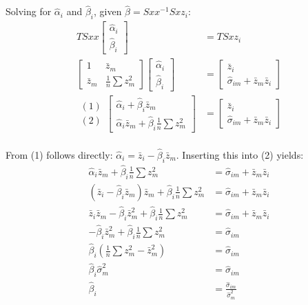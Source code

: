 \documentclass[]{article}
\begin{document}
Solving for $\hat{\alpha}_i$ and $\hat{\beta}_i$, given $\hat{\beta}=Sxx^{-1}Sxz_i$:
\begin{align*}
	TSxx \left[\begin{array}{c}
		\hat{\alpha}_i \\
		\hat{\beta}_i
	\end{array}\right] & = TSxz_i\\
	\left[\begin{array}{cc}
		1 & \bar{z}_m \\
		\bar{z}_m & \frac{1}{n}\sum{z_m^2}
	\end{array}\right] \left[\begin{array}{c}
		\hat{\alpha}_i \\
		\hat{\beta}_i
	\end{array}\right] &= \left[\begin{array}{c}
		\bar{z}_i \\
		\hat{\sigma}_{im} + \bar{z}_m \bar{z}_i 
	\end{array}\right] \\	
	\begin{array}{c}
		(1) \\
		(2)
	\end{array}
	\left[\begin{array}{c}
		\hat{\alpha}_i + \hat{\beta}_i \bar{z}_m \\
		\hat{\alpha}_i \bar{z}_m + \hat{\beta}_i \frac{1}{n}\sum{z_m^2}
	\end{array}\right] &= \left[\begin{array}{c}
		\bar{z}_i \\
		\hat{\sigma}_{im} + \bar{z}_m \bar{z}_i 
	\end{array}\right] \\
\end{align*}

From (1) follows directly: $\hat{\alpha}_i = \bar{z}_i - \hat{\beta}_i \bar{z}_m$. Inserting this into (2) yields:
\begin{align*}
	\hat{\alpha}_i \bar{z}_m + \hat{\beta}_i \frac{1}{n}\sum{z_m^2} &= \hat{\sigma}_{im} + \bar{z}_m \bar{z}_i \\
	(\bar{z}_i - \hat{\beta}_i \bar{z}_m)\bar{z}_m + \hat{\beta}_i \frac{1}{n}\sum{z_m^2} &= \hat{\sigma}_{im} + \bar{z}_m \bar{z}_i \\
	\bar{z}_i \bar{z}_m - \hat{\beta}_i \bar{z}_m^2 + \hat{\beta}_i \frac{1}{n}\sum{z_m^2} &= \hat{\sigma}_{im} + \bar{z}_m \bar{z}_i \\
	- \hat{\beta}_i \bar{z}_m^2 + \hat{\beta}_i \frac{1}{n}\sum{z_m^2} &= \hat{\sigma}_{im}\\
	\hat{\beta}_i  (\frac{1}{n}\sum{z_m^2}-\bar{z}_m^2) &= \hat{\sigma}_{im}\\
	\hat{\beta}_i \hat{\sigma}_{m}^2 &= \hat{\sigma}_{im}\\
	\hat{\beta}_i &=  \frac{\hat{\sigma}_{im}}{\hat{\sigma}_{m}^2}\\
\end{align*}
\end{document}
